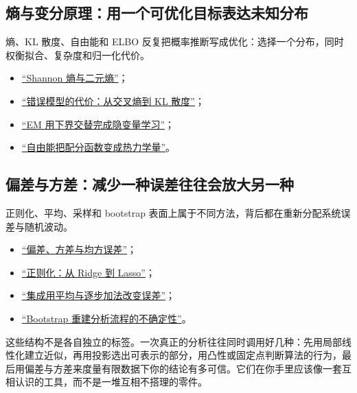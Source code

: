 \subsection{熵与变分原理：用一个可优化目标表达未知分布}

熵、KL 散度、自由能和 ELBO 反复把概率推断写成优化：选择一个分布，同时权衡拟合、复杂度和归一化代价。

\begin{itemize}
\tightlist
\item \hyperref[sec:07-Information-Theory/01-Information-and-Entropy/02]{``Shannon 熵与二元熵''}；
\item \hyperref[sec:07-Information-Theory/03-Divergences/01]{``错误模型的代价：从交叉熵到 KL 散度''}；
\item \hyperref[sec:13-Machine-Learning/06-Probabilistic-Models/04]{``EM 用下界交替完成隐变量学习''}；
\item \hyperref[sec:13-Machine-Learning/13-Statistical-Physics-and-Free-Energy/01]{``自由能把配分函数变成热力学量''}。
\end{itemize}

\subsection{偏差与方差：减少一种误差往往会放大另一种}

正则化、平均、采样和 bootstrap 表面上属于不同方法，背后都在重新分配系统误差与随机波动。

\begin{itemize}
\tightlist
\item \hyperref[sec:11-Mathematical-Statistics/02-Point-Estimation/01]{``偏差、方差与均方误差''}；
\item \hyperref[sec:13-Machine-Learning/02-Linear-Models/02]{``正则化：从 Ridge 到 Lasso''}；
\item \hyperref[sec:13-Machine-Learning/03-Trees-Ensembles-and-Neighbors/02]{``集成用平均与逐步加法改变误差''}；
\item \hyperref[sec:13-Machine-Learning/08-Sampling-and-Inference/04]{``Bootstrap 重建分析流程的不确定性''}。
\end{itemize}

这些结构不是各自独立的标签。一次真正的分析往往同时调用好几种：先用局部线性化建立近似，再用投影选出可表示的部分，用凸性或固定点判断算法的行为，最后用偏差与方差来度量有限数据下你的结论有多可信。它们在你手里应该像一套互相认识的工具，而不是一堆互相不搭理的零件。
